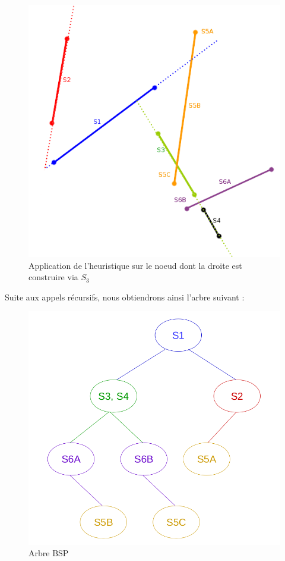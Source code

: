 \documentclass[11pt,a4paper]{article}
\begin{document}
\begin{figure}[H]
\centering
\includegraphics[scale=0.6]{bsp_ex_5.png}
\caption{Application de l'heuristique sur le noeud dont la droite est construire via $S_3$}
\label{bsp_ex_5}
\end{figure}

Suite aux appels récursifs, nous obtiendrons ainsi l'arbre suivant :

\begin{figure}[H]
\centering
\includegraphics[scale=0.35]{bsp_ex_3.png}
\caption{Arbre BSP}
\label{bsp_tree}
\end{figure}
\end{document}
